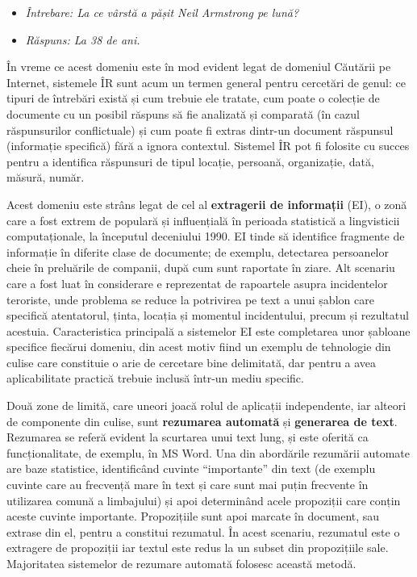 \documentclass[]{../../metanetpaper}
\begin{document}
\begin{multicols}{2}
\begin{itemize}
\item\textit{Întrebare: La ce vârstă a pășit Neil Armstrong pe lună?}
\item\textit{Răspuns: La 38 de ani.}
\end{itemize}

În vreme ce acest domeniu este în mod evident legat de domeniul Căutării pe Internet, sistemele ÎR sunt acum un termen general pentru cercetări de genul: ce tipuri de întrebări există și cum trebuie ele tratate, cum poate o colecție de documente cu un posibil răspuns să fie analizată și comparată (în cazul răspunsurilor conflictuale) și cum poate fi extras dintr-un document răspunsul (informație specifică) fără a ignora contextul. Sistemel ÎR pot fi folosite cu succes pentru a identifica răspunsuri de tipul locație, persoană, organizație, dată, măsură, număr.

Acest domeniu este strâns legat de cel al \textbf{extragerii de informații} (EI), o zonă care a fost extrem de populară și influențială în perioada statistică a lingvisticii computaționale, la începutul deceniului 1990. EI tinde să identifice fragmente de informație în diferite clase de documente; de exemplu, detectarea persoanelor cheie în preluările de companii, după cum sunt raportate în ziare. Alt scenariu care a fost luat în considerare e reprezentat de rapoartele asupra incidentelor teroriste, unde problema se reduce la potrivirea pe text a unui șablon care specifică atentatorul, ținta, locația și momentul incidentului, precum și rezultatul acestuia. Caracteristica principală a sistemelor EI este completarea unor șabloane specifice fiecărui domeniu, din acest motiv fiind un exemplu de tehnologie din culise care constituie o arie de cercetare bine delimitată, dar pentru a avea aplicabilitate practică trebuie inclusă într-un mediu specific.

Două zone de limită, care uneori joacă rolul de aplicații independente, iar alteori de componente din culise, sunt \textbf{rezumarea automată} și \textbf{generarea de text}. Rezumarea se referă evident la scurtarea unui text lung, și este oferită ca funcționalitate, de exemplu, în MS Word. Una din abordările rezumării automate are baze statistice, identificând cuvinte “importante” din text (de exemplu cuvinte care au frecvență mare în text și care sunt mai puțin frecvente în utilizarea comună a limbajului) și apoi determinând acele propoziții care conțin aceste cuvinte importante. Propozițiile sunt apoi marcate în document, sau extrase din el, pentru a constitui rezumatul. În acest scenariu, rezumatul este o extragere de propoziții iar textul este redus la un subset din propozițiile sale. Majoritatea sistemelor de rezumare automată folosesc această metodă. 


\end{multicols}
\end{document}
